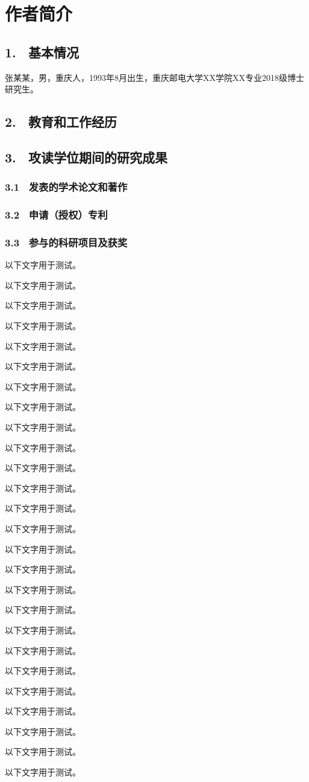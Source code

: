 \specialsectioning


\chapter{作者简介}
\thispagestyle{others}
\pagestyle{others}
\xiaosi

\section{1. \ 基本情况}
张某某，男，重庆人，1993年8月出生，重庆邮电大学XX学院XX专业2018级博士研究生。

\section{2. \ 教育和工作经历}

\section{3. \ 攻读学位期间的研究成果}

\subsection{3.1 \ 发表的学术论文和著作}

\subsection{3.2 \ 申请（授权）专利}

\subsection{3.3 \ 参与的科研项目及获奖}

以下文字用于测试。

以下文字用于测试。

以下文字用于测试。

以下文字用于测试。

以下文字用于测试。

以下文字用于测试。

以下文字用于测试。

以下文字用于测试。

以下文字用于测试。

以下文字用于测试。

以下文字用于测试。

以下文字用于测试。

以下文字用于测试。

以下文字用于测试。

以下文字用于测试。

以下文字用于测试。

以下文字用于测试。

以下文字用于测试。

以下文字用于测试。

以下文字用于测试。

以下文字用于测试。

以下文字用于测试。

以下文字用于测试。

以下文字用于测试。

以下文字用于测试。

以下文字用于测试。



